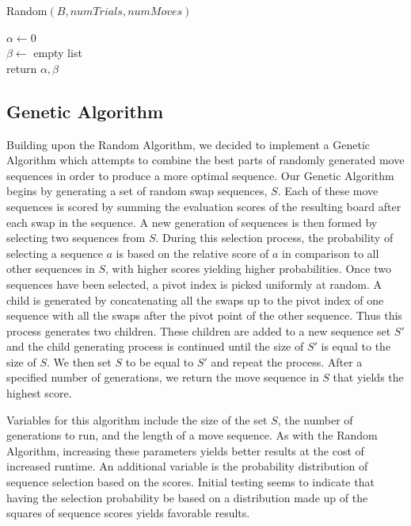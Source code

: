 \documentclass[12pt]{IEEEtran}
\begin{document}
\begin{algorithm}\label{random}\small
\caption{\small Random$(B, numTrials, numMoves)$}
$\alpha \gets 0$ \\
$\beta \gets $ empty list\\
return $\alpha, \beta$
\end{algorithm}

\subsection{Genetic Algorithm}

Building upon the Random Algorithm, we decided to implement a Genetic Algorithm which attempts to combine the best parts of randomly generated move sequences in order to produce a more optimal sequence. Our Genetic Algorithm begins by generating a set of random swap sequences, $S$. Each of these move sequences is scored by summing the evaluation scores of the resulting board after each swap in the sequence. A new generation of sequences is then formed by selecting two sequences from $S$. During this selection process, the probability of selecting a sequence $a$ is based on the relative score of $a$ in comparison to all other sequences in $S$, with higher scores yielding higher probabilities. Once two sequences have been selected, a pivot index is picked uniformly at random. A child is generated by concatenating all the swaps up to the pivot index of one sequence with all the swaps after the pivot point of the other sequence. Thus this process generates two children. These children are added to a new sequence set $S'$ and the child generating process is continued until the size of $S'$ is equal to the size of $S$. We then set $S$ to be equal to $S'$ and repeat the process. After a specified number of generations, we return the move sequence in $S$ that yields the highest score.

Variables for this algorithm include the size of the set $S$, the number of generations to run, and the length of a move sequence. As with the Random Algorithm, increasing these parameters yields better results at the cost of increased runtime. An additional variable is the probability distribution of sequence selection based on the scores. Initial testing seems to indicate that having the selection probability be based on a distribution made up of the squares of sequence scores yields favorable results.
\end{document}
